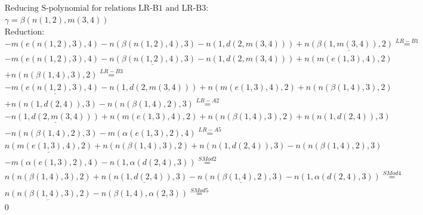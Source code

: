 \documentclass[11pt]{amsart}
\begin{document}
\begin{align*} 
& \text{Reducing S-polynomial for relations LR-B1 and LR-B3:} \\ 
& \gamma = \beta(n(1,2),m(3,4)) \\ 
& \text{Reduction}: \\& - m(e(n(1,2),3),4) - n(\beta(n(1,2),4),3) - n(1,d(2,m(3,4))) + \underline{n(\beta(1,m(3,4)),2)} \stackrel{ LR-B1 }{=}  \\ 
& - m(e(n(1,2),3),4) - \underline{n(\beta(n(1,2),4),3)} - n(1,d(2,m(3,4))) + n(m(e(1,3),4),2)\\ 
 &  + n(n(\beta(1,4),3),2) \stackrel{ LR-B3 }{=}  \\ 
& - \underline{m(e(n(1,2),3),4)} - n(1,d(2,m(3,4))) + n(m(e(1,3),4),2) + n(n(\beta(1,4),3),2)\\ 
 &  + n(n(1,d(2,4)),3) - n(n(\beta(1,4),2),3) \stackrel{ LR-A2 }{=}  \\ 
& - \underline{n(1,d(2,m(3,4)))} + n(m(e(1,3),4),2) + n(n(\beta(1,4),3),2) + n(n(1,d(2,4)),3)\\ 
 &  - n(n(\beta(1,4),2),3) - m(\alpha(e(1,3),2),4) \stackrel{ LR-A5 }{=}  \\ 
&\underline{n(m(e(1,3),4),2)} + n(n(\beta(1,4),3),2) + n(n(1,d(2,4)),3) - n(n(\beta(1,4),2),3)\\ 
 &  - m(\alpha(e(1,3),2),4) - n(1,\alpha(d(2,4),3)) \stackrel{ SMod2 }{=}  \\ 
&n(n(\beta(1,4),3),2) + \underline{n(n(1,d(2,4)),3)} - \underline{n(n(\beta(1,4),2),3)} - n(1,\alpha(d(2,4),3)) \stackrel{ SMod4 }{=}  \\ 
&\underline{n(n(\beta(1,4),3),2)} - n(\beta(1,4),\alpha(2,3)) \stackrel{ SMod5 }{=}  \\ 
&0\\ 
\end{align*} 
 
\end{document}
